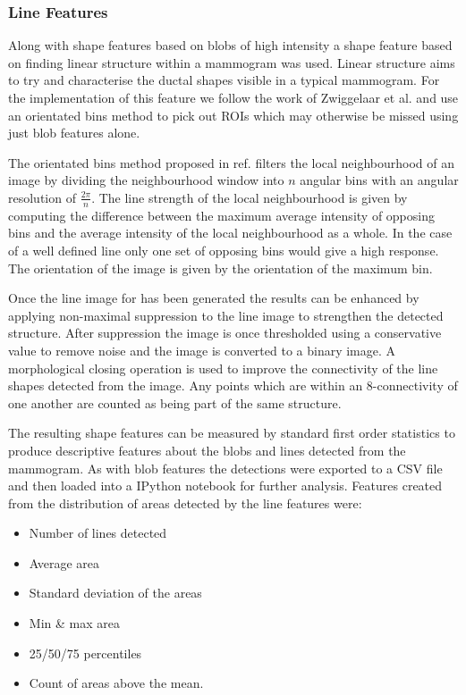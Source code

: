 \subsubsection{Line Features}
Along with shape features based on blobs of high intensity a shape feature based on finding linear structure within a mammogram was used. Linear structure aims to try and characterise the ductal shapes visible in a typical mammogram. For the implementation of this feature we follow the work of Zwiggelaar et al. \cite{zwiggelaar1996finding} and use an orientated bins method to pick out ROIs which may otherwise be missed using just blob features alone.

The orientated bins method proposed in ref. \cite{zwiggelaar1996finding} filters the local neighbourhood of an image by dividing the neighbourhood window into $n$ angular bins with an angular resolution of $\frac{2 \pi}{n}$. The line strength of the local neighbourhood is given by computing the difference between the maximum average intensity of opposing bins and the average intensity of the local neighbourhood as a whole. In the case of a well defined line only one set of opposing bins would give a high response. The orientation of the image is given by the orientation of the maximum bin.

Once the line image for has been generated the results can be enhanced by applying non-maximal suppression \cite{sonka2014image} to the line image to strengthen the detected structure. After suppression the image is once thresholded using a conservative value to remove noise and the image is converted to a binary image. A morphological closing operation is used to improve the connectivity of the line shapes detected from the image. Any points which are within an 8-connectivity of one another are counted as being part of the same structure.

The resulting shape features can be measured by standard first order statistics to produce descriptive features about the blobs and lines detected from the mammogram. As with blob features the detections were exported to a CSV file and then loaded into a IPython notebook for further analysis. Features created from the distribution of areas detected by the line features were:

\begin{itemize}
	\item Number of lines detected
	\item Average area
	\item Standard deviation of the areas
	\item Min \& max area
	\item 25/50/75 percentiles
	\item Count of areas above the mean.
\end{itemize}

